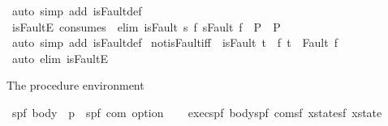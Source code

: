 \begin{isabellebody}
\ {\isacharparenleft}auto\ simp\ add{\isacharcolon}\ isFault{\isacharunderscore}def{\isacharparenright}%
\endisatagproof
{\isafoldproof}%
%
\isadelimproof
\isanewline
%
\endisadelimproof
\isanewline
{}\isamarkupfalse%
\ isFaultE\ {\isacharbrackleft}consumes\ {}{\isacharcomma}\ elim{\isacharquery}{\isacharbrackright}{\isacharcolon}\ {\isachardoublequoteopen}{\isasymlbrakk}isFault\ s{\isacharsemicolon}\ {\isasymAnd}f{\isachardot}\ s{\isacharequal}Fault\ f\ {\isasymLongrightarrow}\ P{\isasymrbrakk}\ {\isasymLongrightarrow}\ P{\isachardoublequoteclose}\isanewline
%
\isadelimproof
\ \ %
\endisadelimproof
%
\isatagproof
{}\isamarkupfalse%
\ {\isacharparenleft}auto\ simp\ add{\isacharcolon}\ isFault{\isacharunderscore}def{\isacharparenright}%
\endisatagproof
{\isafoldproof}%
%
\isadelimproof
\isanewline
%
\endisadelimproof
\isanewline
{}\isamarkupfalse%
\ not{\isacharunderscore}isFault{\isacharunderscore}iff{\isacharcolon}\ {\isachardoublequoteopen}{\isacharparenleft}{\isasymnot}\ isFault\ t{\isacharparenright}\ {\isacharequal}\ {\isacharparenleft}{\isasymforall}f{\isachardot}\ t\ {\isasymnoteq}\ Fault\ f{\isacharparenright}{\isachardoublequoteclose}\isanewline
%
\isadelimproof
\ \ %
\endisadelimproof
%
\isatagproof
{}\isamarkupfalse%
\ {\isacharparenleft}auto\ elim{\isacharcolon}\ isFaultE{\isacharparenright}%
\endisatagproof
{\isafoldproof}%
%
\isadelimproof
%
\endisadelimproof
%
\isamarkuptrue%
%
\begin{isamarkuptext}%
The procedure environment%
\end{isamarkuptext}\isamarkuptrue%
\isamarkupfalse%
\ {\isacharparenleft}{\isacharprime}s{\isacharcomma}{\isacharprime}p{\isacharcomma}{\isacharprime}f{\isacharparenright}\ body\ {\isacharequal}\ {\isachardoublequoteopen}{\isacharprime}p\ {\isasymRightarrow}\ {\isacharparenleft}{\isacharprime}s{\isacharcomma}{\isacharprime}p{\isacharcomma}{\isacharprime}f{\isacharparenright}\ com\ option{\isachardoublequoteclose}\isanewline
\isanewline
{}\isamarkupfalse%
\ \isanewline
\ \ {\isachardoublequoteopen}exec{\isachardoublequoteclose}{\isacharcolon}{\isacharcolon}{\isachardoublequoteopen}{\isacharbrackleft}{\isacharparenleft}{\isacharprime}s{\isacharcomma}{\isacharprime}p{\isacharcomma}{\isacharprime}f{\isacharparenright}\ body{\isacharcomma}{\isacharparenleft}{\isacharprime}s{\isacharcomma}{\isacharprime}p{\isacharcomma}{\isacharprime}f{\isacharparenright}\ com{\isacharcomma}{\isacharparenleft}{\isacharprime}s{\isacharcomma}{\isacharprime}f{\isacharparenright}\ xstate{\isacharcomma}{\isacharparenleft}{\isacharprime}s{\isacharcomma}{\isacharprime}f{\isacharparenright}\ xstate{\isacharbrackright}\ \isanewline

\end{isabellebody}

